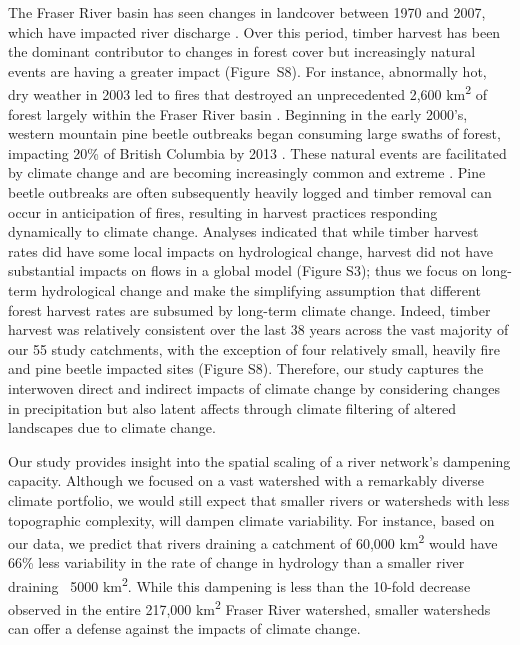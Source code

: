 \documentclass[draft,linenumbers]{AGUJournal}
\begin{document}
The Fraser River basin has seen changes in landcover between 1970 and 2007, which have impacted river discharge \citep[e.g.,][]{Zhang:2014}. Over this period, timber harvest has been the dominant contributor to changes in forest cover but increasingly natural events are having a greater impact (Figure~S8). For instance, abnormally hot, dry weather in 2003 led to fires that destroyed an unprecedented 2,600 km\textsuperscript{2} of forest largely within the Fraser River basin \citep{Filmon:2003}. Beginning in the early 2000's, western mountain pine beetle outbreaks began consuming large swaths of forest, impacting 20\% of British Columbia by 2013 \citep{schnorbus:2010}. These natural events are facilitated by climate change and are becoming increasingly common and extreme \citep{Melillo:2014, Maness:2013}. Pine beetle outbreaks are often subsequently heavily logged and timber removal can occur in anticipation of fires, resulting in harvest practices responding dynamically to climate change. Analyses indicated that while timber harvest rates did have some local impacts on hydrological change, harvest did not have substantial impacts on flows in a global model (Figure S3); thus we focus on long-term hydrological change and make the simplifying assumption that different forest harvest rates are subsumed by long-term climate change. Indeed, timber harvest was relatively consistent over the last 38 years across the vast majority of our 55 study catchments, with the exception of four relatively small, heavily fire and pine beetle impacted sites (Figure S8). Therefore, our study captures the interwoven direct and indirect impacts of climate change by considering changes in precipitation but also latent affects through climate filtering of altered landscapes due to climate change.

Our study provides insight into the spatial scaling of a river network's dampening capacity. Although we focused on a vast watershed with a remarkably diverse climate portfolio, we would still expect that smaller rivers or watersheds with less topographic complexity, will dampen climate variability. For instance, based on our data, we predict that rivers draining a catchment of 60,000 km\textsuperscript{2} would have 66\% less variability in the rate of change in hydrology than a smaller river draining ~5000 km\textsuperscript{2}. While this dampening is less than the 10-fold decrease observed in the entire 217,000 km\textsuperscript{2} Fraser River watershed, smaller watersheds can offer a defense against the impacts of climate change.
\end{document}
